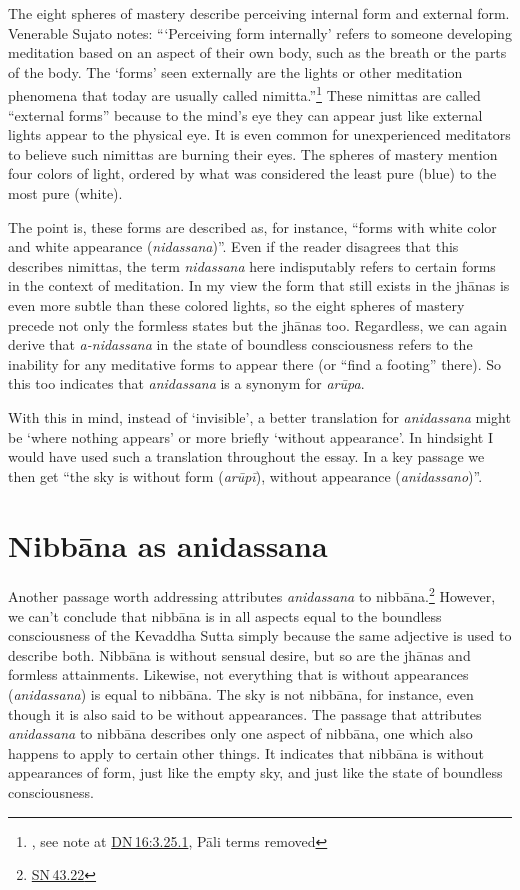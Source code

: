 \documentclass[10pt, openright]{book}
\begin{document}
The eight spheres of mastery describe perceiving internal form and external form. Venerable Sujato notes: “‘Perceiving form internally’ refers to someone developing meditation based on an aspect of their own body, such as the breath or the parts of the body. The ‘forms’ seen externally are the lights or other meditation phenomena that today are usually called nimitta.”\footnote {\cite{Sujato 2018}, see note at \href{https://suttacentral.net/dn16/en/sujato\#3.25.1}{DN 16:3.25.1}, Pāli terms removed} These nimittas are called “external forms” because to the mind’s eye they can appear just like external lights appear to the physical eye. It is even common for unexperienced meditators to believe such nimittas are burning their eyes. The spheres of mastery mention four colors of light, ordered by what was considered the least pure (blue) to the most pure (white).


The point is, these forms are described as, for instance, “forms with white color and white appearance (\textit{nidassana})”. Even if the reader disagrees that this describes nimittas, the term \textit{nidassana} here indisputably refers to certain forms in the context of meditation. In my view the form that still exists in the jhānas is even more subtle than these colored lights, so the eight spheres of mastery precede not only the formless states but the jhānas too. Regardless, we can again derive that \textit{a-nidassana} in the state of boundless consciousness refers to the inability for any meditative forms to appear there (or “find a footing” there). So this too indicates that \textit{anidassana} is a synonym for \textit{arūpa}.


With this in mind, instead of ‘invisible’, a better translation for \textit{anidassana} might be ‘where nothing appears’ or more briefly ‘without appearance’. In hindsight I would have used such a translation throughout the essay. In a key passage we then get “the sky is without form (\textit{arūpī}), without appearance (\textit{anidassano})”.




\section{Nibbāna as anidassana}
Another passage worth addressing attributes \textit{anidassana} to nibbāna.\footnote {\href{https://suttacentral.net/sn43.22/en/sujato}{SN 43.22}} However, we can’t conclude that nibbāna is in all aspects equal to the boundless consciousness of the Kevaddha Sutta simply because the same adjective is used to describe both. Nibbāna is without sensual desire, but so are the jhānas and formless attainments. Likewise, not everything that is without appearances (\textit{anidassana}) is equal to nibbāna. The sky is not nibbāna, for instance, even though it is also said to be without appearances. The passage that attributes \textit{anidassana} to nibbāna describes only one aspect of nibbāna, one which also happens to apply to certain other things. It indicates that nibbāna is without appearances of form, just like the empty sky, and just like the state of boundless consciousness.
\end{document}
